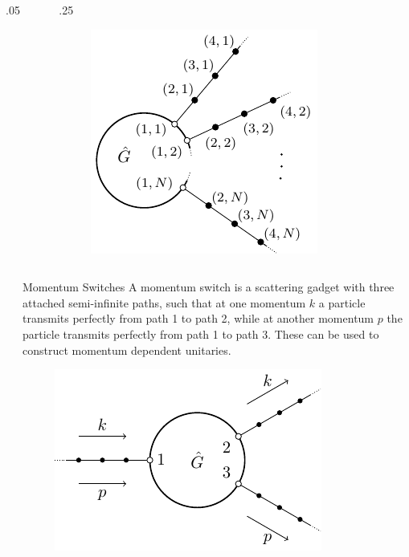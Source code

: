 \documentclass{beamer}
\newlength{\sepwid}
\newlength{\onecolwid}
\newlength{\twocolwid}
\begin{document}
\begin{frame}[t]
\begin{columns}[t]
      \begin{column}{.05\twocolwid}\end{column}
      \begin{column}{.25\twocolwid}
      
      
      \begin{figure}
        \includegraphics[width=.25\twocolwid]{scattering_graph.pdf}
      \end{figure}
      
      \end{column}
      
      \begin{column}{\sepwid}\end{column}
    \end{columns}
       
    
    
  \begin{columns}[t]
  \begin{column}{\sepwid}\end{column}
  \begin{column}{\onecolwid}
    \begin{block}{Momentum Switches}
        A momentum switch is a scattering gadget with three attached semi-infinite paths, such that at one momentum $k$ a particle transmits perfectly from path 1 to path 2, while at another momentum $p$ the particle transmits perfectly from path 1 to path 3.  These can be used to construct momentum dependent unitaries.
       
       \begin{figure}
         \includegraphics[height=.25\onecolwid]{momentum_switch.pdf}
       \end{figure}
        

\end{block}
\end{column}
\end{columns}
\end{frame}
\end{document}
